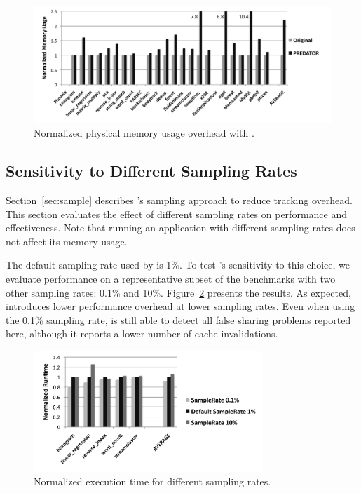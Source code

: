 \begin{figure}[!t]
\begin{center} 
\includegraphics[width=6.5in]{fig/memusage}
\end{center}
\caption{Normalized physical memory usage overhead with \Predator{}.}
\label{fig:memusage}
\end{figure}


\subsection{Sensitivity to Different Sampling Rates}
\label{sec:sensitivity}

Section~\ref{sec:sample} describes \Predator{}'s sampling approach to reduce tracking overhead. This section evaluates the effect of different sampling rates on performance and effectiveness. Note that running an application with different sampling rates does not affect its memory usage.

The default sampling rate used by \Predator{} is 1\%. To test \Predator{}'s sensitivity to this choice, we evaluate performance on a representative subset of the benchmarks with two other sampling rates: 0.1\% and 10\%. Figure~\ref{fig:sample} presents the results. As expected, \Predator{} introduces lower performance overhead at lower sampling rates. Even when using the 0.1\% sampling rate, \Predator{} is still able to detect all false sharing problems reported here, although it reports a lower number of cache invalidations.
 
\begin{figure}[!t]
\begin{center} 
\includegraphics[width=3.4in]{fig/sample}
\end{center}
\caption{Normalized execution time for different sampling rates.}
\label{fig:sample}
\end{figure}



